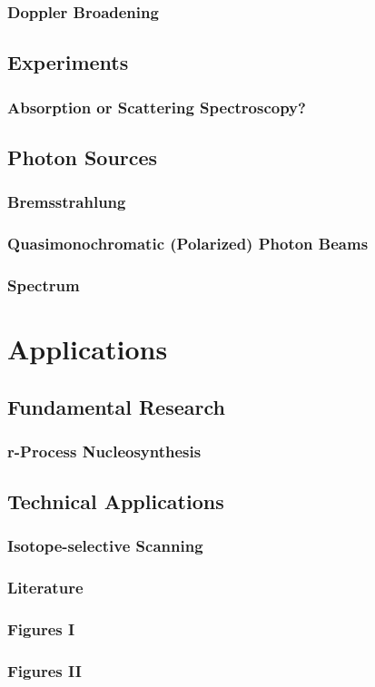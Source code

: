 \documentclass{beamer}
\begin{document}
\begin{frame}
    \frametitle{Doppler Broadening}
    
\end{frame}

\subsection{Experiments}

\begin{frame}
    \frametitle{Absorption or Scattering Spectroscopy?}
    
\end{frame}

\subsection{Photon Sources}

\begin{frame}
    \frametitle{Bremsstrahlung}
    
\end{frame}

\begin{frame}
    \frametitle{Quasimonochromatic (Polarized) Photon Beams}
    
\end{frame}

\begin{frame}
    \frametitle{Spectrum}
    
\end{frame}

\section{Applications}

\subsection{Fundamental Research}

\begin{frame}
    \frametitle{r-Process Nucleosynthesis}
      
\end{frame}

\subsection{Technical Applications}

\begin{frame}
    \frametitle{Isotope-selective Scanning}
    
\end{frame}

\begin{frame}
    \frametitle{Literature}
    
\end{frame}

\begin{frame}
    \frametitle{Figures I}
    
\end{frame}

\begin{frame}
    \frametitle{Figures II}
    
\end{frame}
\end{document}
